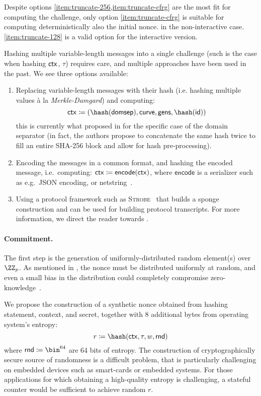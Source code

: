 \documentclass[runningheads,11pt]{article}
\begin{document}
Despite options \cref{item:truncate-256,item:truncate-cfrg} are the most fit for computing the challenge, only option \cref{item:truncate-cfrg} is suitable for computing deterministically also the initial nonce. in the non-interactive case. \cref{item:truncate-128} is a valid option for the interactive version.

Hashing multiple variable-length messages into a single challenge (such is the case when hashing $\mathsf{ctx}$, $\tau$) requires care, and multiple approaches have been used in the past. We see three options available:
\begin{enumerate}[label=$(\alph*)$]
  \item Replacing variable-length messages with their hash (i.e. hashing multiple values à la \emph{Merkle-Damgard}) and computing:
  \[
    \ctx \defeq (\hash(\domsepctx), \curvectx, \generatorsctx, \hash(\idctx))
  \]
  this is currently what proposed in \cite{bip-schnorr} for the specific case of the domain separator (in fact, the authors propose to concatenate the same hash twice to fill an entire SHA-256 block and allow for hash pre-processing).
  \item Encoding the messages in a common format, and hashing the encoded message, i.e.\ computing:
  \( \mathsf{ctx} \coloneqq \mathsf{encode}(\mathsf{ctx})\),
  where $\mathsf{encode}$ is a serializer such as e.g.\ JSON encoding, or netstring~\cite{bernstein-netstrings-02}.
  \item Using a protocol framework such as \textsc{Strobe}~\cite{EPRINT:Hamburg17} that builds a sponge construction and can be used for building protocol transcripts. For more information, we direct the reader towards \cite[Section 5.3]{EPRINT:Hamburg17}.
\end{enumerate}

\paragraph{Commitment.} The first step is the generation of uniformly-distributed random element(s) over $\ZZ_p$. As mentioned in , the nonce must be distributed uniformly at random, and even a small bias in the distribution could completely compromise zero-knowledge~\cite{lattice-attack,bleichenbacher,CCS:ANTTY20}.

We propose the construction of a synthetic nonce obtained from hashing statement, context, and secret, together with 8 additional bytes from operating system's entropy:
\[
  r \defeq \hash(\ctx, \stag, \witness, \mathsf{rnd})
\]
where $\mathsf{rnd} \defeq \bin^{64}$ are 64 bits of entropy.
The construction of cryptographically secure source of randomness is a difficult problem, that is particularly challenging on embedded devices such as smart-cards or embedded systems. For those applications for which obtaining a high-quality entropy is challenging, a stateful counter would be sufficient to achieve random $r$.
\end{document}
